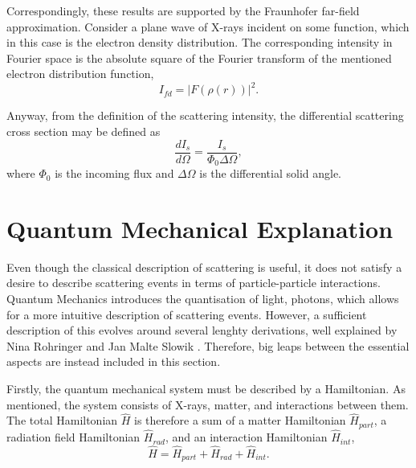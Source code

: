 Correspondingly, these results are supported by the Fraunhofer far-field approximation. Consider a plane wave of X-rays incident on some function, which in this case is the electron density distribution.
The corresponding intensity in Fourier space is the absolute square of the Fourier transform of the mentioned electron distribution function,
\begin{equation}\label{eq:Fraunhofer_intensity}
    I_{fd} = |F\left(\rho(r) \right) |^{2}.
\end{equation}

Anyway, from the definition of the scattering intensity, the differential scattering cross section may be defined as
\begin{equation}\label{eq:scattering_crossection}
    \frac{dI_{s}}{d\Omega} = \frac{I_{s}}{\Phi_{0} \Delta\Omega},
\end{equation}
where $\Phi_{0}$ is the incoming flux and $\Delta\Omega$ is the differential solid angle.



\section{Quantum Mechanical Explanation}\label{sec:quantum_scattering}

Even though the classical description of scattering is useful, it does not satisfy a desire to describe scattering events in terms of particle-particle interactions.
Quantum Mechanics introduces the quantisation of light, photons, which allows for a more intuitive description of scattering events.
However, a sufficient description of this evolves around several lenghty derivations, well explained by Nina Rohringer \cite{rohringer2020introduction} and Jan Malte Slowik \cite{slowik2015quantum}.
Therefore, big leaps between the essential aspects are instead included in this section.

Firstly, the quantum mechanical system must be described by a Hamiltonian. As mentioned, the system consists of X-rays, matter, and interactions between them.
The total Hamiltonian $\hat{H}$ is therefore a sum of a matter Hamiltonian $\hat{H}_{part}$, a radiation field Hamiltonian $\hat{H}_{rad}$, and an interaction Hamiltonian $\hat{H}_{int}$,
\begin{equation}\label{eq:total_Hamiltonian}
    \hat{H} = \hat{H}_{part} + \hat{H}_{rad} + \hat{H}_{int}.
\end{equation}


